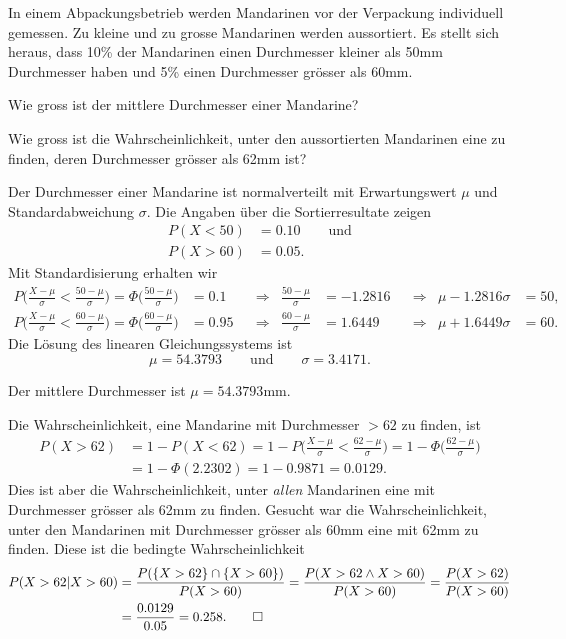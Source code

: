 In einem Abpackungsbetrieb werden Mandarinen vor der Verpackung
individuell gemessen.
Zu kleine und zu grosse Mandarinen werden aussortiert.
Es stellt sich heraus, dass 10\% der Mandarinen einen Durchmesser
kleiner als 50mm Durchmesser haben und 5\% einen Durchmesser grösser als 60mm.
\begin{teilaufgaben}
\item
Wie gross ist der mittlere Durchmesser einer Mandarine?
\item
Wie gross ist die Wahrscheinlichkeit, unter den aussortierten 
Mandarinen eine zu finden, deren Durchmesser grösser als 62mm ist?
\end{teilaufgaben}


\begin{loesung}
Der Durchmesser einer Mandarine ist normalverteilt mit Erwartungswert
$\mu$ und Standardabweichung $\sigma$.
Die Angaben über die Sortierresultate zeigen
\begin{align*}
P(X<50) &= 0.10 \qquad\text{und}\\
P(X>60) &= 0.05.
\end{align*}
Mit Standardisierung erhalten wir
\begin{align*}
P\biggl(\frac{X-\mu}{\sigma} < \frac{50-\mu}{\sigma}\biggr)
=
\Phi\biggl(\frac{50-\mu}{\sigma}\biggr)
&= 0.1
&&\Rightarrow&
\frac{50-\mu}{\sigma} 
&=
-1.2816
&&\Rightarrow&
\mu
-1.2816\sigma&=
50,
\\
P\biggl(\frac{X-\mu}{\sigma} < \frac{60-\mu}{\sigma}\biggr)
=
\Phi\biggl(\frac{60-\mu}{\sigma}\biggr)
&= 0.95
&&\Rightarrow&
\frac{60-\mu}{\sigma}
&=
1.6449
&&\Rightarrow&
\mu+1.6449\sigma
&=
60.
\end{align*}
Die Lösung des linearen Gleichungssystems ist
\[
\mu = 54.3793
\qquad\text{und}\qquad
\sigma = 3.4171.
\]
\begin{teilaufgaben}
\item
Der mittlere Durchmesser ist $\mu=54.3793\text{mm}$.
\item
Die Wahrscheinlichkeit, eine Mandarine mit Durchmesser $>62$ 
zu finden, ist
\begin{align*}
P(X>62)
&=
1-P(X<62)
=
1-P\biggl(\frac{X-\mu}{\sigma} < \frac{62-\mu}{\sigma}\biggr)
=
1-\Phi\biggl(\frac{62-\mu}{\sigma}\biggr)
\\
&=
1-\Phi(2.2302)
=
1-0.9871
=
0.0129.
\end{align*}
Dies ist aber die Wahrscheinlichkeit, unter {\em allen} Mandarinen
eine mit Durchmesser grösser als 62mm zu finden.
Gesucht war die Wahrscheinlichkeit, unter den Mandarinen mit
Durchmesser grösser als 60mm eine mit 62mm zu finden.
Diese ist die bedingte Wahrscheinlichkeit
\begin{align*}
P(X > 62 | X > 60)
&=
\frac{P(\{X>62\}\cap\{X>60\})}{P(X>60)}
=
\frac{P(X>62\wedge X>60)}{P(X>60)}
=
\frac{P(X>62)}{P(X>60)}
\\
&=
\frac{0.0129}{0.05}
=
0.258.
\qedhere
\end{align*}
\end{teilaufgaben}
\end{loesung}

